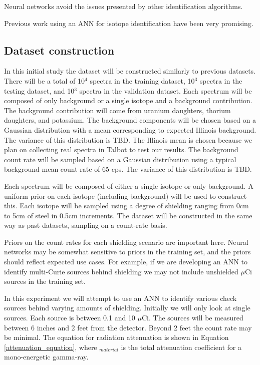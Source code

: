 \documentclass[thesis,tocnosub,noragright,centerchapter,12pt,fullpage]{uiucecethesis09}
\begin{document}
Neural networks avoid the issues presented by other identification algorithms. 

Previous work using an ANN for isotope identification have been very promising.

\subsection{Dataset construction}

In this initial study the dataset will be constructed similarly to previous datasets. There will be a total of 10$^{4}$ spectra in the training dataset, 10$^{3}$ spectra in the testing dataset, and 10$^{3}$ spectra in the validation dataset. Each spectrum will be composed of only background or  a single isotope and a background contribution. The background contribution will come from uranium daughters, thorium daughters, and potassium. The background components will be chosen based on a Gaussian distribution with a mean corresponding to expected Illinois background. The variance of this distribution is TBD. The Illinois mean is chosen because we plan on collecting real spectra in Talbot to test our results. The background count rate will be sampled based on a Gaussian distribution using a typical background mean count rate of 65 cps. The variance of this distribution is TBD. 

Each spectrum will be composed of either a single isotope or only background. A uniform prior on each isotope (including background) will be used to construct this. Each isotope will be sampled using a degree of shielding ranging from 0cm to 5cm of steel in 0.5cm increments. The dataset will be constructed in the same way as past datasets, sampling on a count-rate basis.

Priors on the count rates for each shielding scenario are important here. Neural networks may be somewhat sensitive to priors in the training set, and the priors should reflect expected use cases. For example, if we  are developing an ANN to identify multi-Curie sources behind shielding we may not include unshielded $\mu$Ci sources in the training set.

In this experiment we will attempt to use an ANN to identify various check sources behind varying amounts of shielding. Initially we will only look at single sources. Each source is between 0.1 and 10 $\mu$Ci. The sources will be measured between 6 inches and 2 feet from the detector. Beyond 2 feet the count rate may be minimal. The equation for radiation attenuation is shown in Equation \ref{attenuation_equation}, where \mu$_{material}$ is the  total attenuation coefficient for a mono-energetic gamma-ray. 
\end{document}
